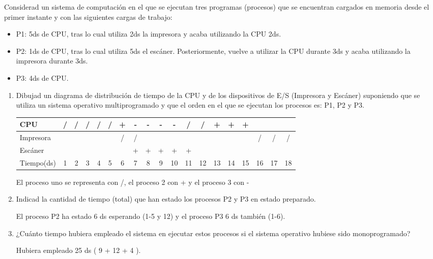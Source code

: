 \begin{ejercicio}
    Considerad un sistema de computación en el que se ejecutan tres programas (procesos) que se encuentran cargados en memoria desde el primer instante y con las siguientes cargas de trabajo:
\begin{itemize}
    \item P1: 5ds de CPU, tras lo cual utiliza 2ds la impresora y acaba utilizando la CPU 2ds.
    \item P2: 1ds de CPU, tras lo cual utiliza 5ds el escáner. Posteriormente, vuelve a utilizar la CPU durante 3ds y acaba utilizando la impresora durante 3ds.
    \item P3: 4ds de CPU.
\end{itemize}

\begin{enumerate}
    \item Dibujad un diagrama de distribución de tiempo de la CPU y de los dispositivos de E/S (Impresora y Escáner) suponiendo que se utiliza un sistema operativo multiprogramado y que el orden en el que se ejecutan los procesos es: P1, P2 y P3.

   \begin{table}[H]
       \centering
       \begin{tabular}{|l|c|c|c|c|c|c|c|c|c|c|c|c|c|c|c|c|c|c|}
		\hline
		CPU &/&/&/&/&/&+&-&-&-&-&/&/&+&+&+&&&  \\ \hline
		Impresora &&&&&&/&/&&&&&&&&&/&/&/ \\ \hline
		Escáner &&&&&&&+&+&+&+&+&&&&&&& \\ \hline
		Tiempo(ds) & 1 & 2 & 3 & 4 & 5 & 6 & 7 & 8 & 9 & 10 & 11 & 12 & 13 & 14 &15 & 16 & 17 & 18 \\ 
		\hline
	\end{tabular}
   \end{table}
 
	El proceso uno se representa con /, el proceso 2 con + y el proceso 3 con - 

    \item Indicad la cantidad de tiempo (total) que han estado los procesos P2 y P3 en estado preparado.

    El proceso P2 ha estado 6 ds esperando (1-5 y 12) y el proceso P3 6 ds también (1-6). 

    \item ¿Cuánto tiempo hubiera empleado el sistema en ejecutar estos procesos si el sistema operativo hubiese sido monoprogramado?

    Hubiera empleado 25 ds ( 9 + 12 + 4 ).
\end{enumerate}
\end{ejercicio}